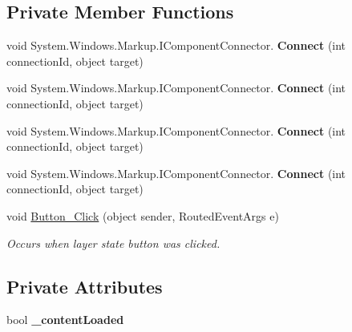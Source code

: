\subsection*{Private Member Functions}
\begin{DoxyCompactItemize}
\item 
\mbox{\label{class_wpf_handler_1_1_u_i_1_1_controls_1_1_header_a51aa62d103bb6008eb6760c6ff8a9a3d}} 
void System.\+Windows.\+Markup.\+I\+Component\+Connector. {\bfseries Connect} (int connection\+Id, object target)
\item 
\mbox{\label{class_wpf_handler_1_1_u_i_1_1_controls_1_1_header_a51aa62d103bb6008eb6760c6ff8a9a3d}} 
void System.\+Windows.\+Markup.\+I\+Component\+Connector. {\bfseries Connect} (int connection\+Id, object target)
\item 
\mbox{\label{class_wpf_handler_1_1_u_i_1_1_controls_1_1_header_a51aa62d103bb6008eb6760c6ff8a9a3d}} 
void System.\+Windows.\+Markup.\+I\+Component\+Connector. {\bfseries Connect} (int connection\+Id, object target)
\item 
\mbox{\label{class_wpf_handler_1_1_u_i_1_1_controls_1_1_header_a51aa62d103bb6008eb6760c6ff8a9a3d}} 
void System.\+Windows.\+Markup.\+I\+Component\+Connector. {\bfseries Connect} (int connection\+Id, object target)
\item 
void \mbox{\hyperlink{class_wpf_handler_1_1_u_i_1_1_controls_1_1_header_ae986415a1ad448e5d3a6c5b88504f11d}{Button\+\_\+\+Click}} (object sender, Routed\+Event\+Args e)
\begin{DoxyCompactList}\small\item\em Occurs when layer state button was clicked. \end{DoxyCompactList}\end{DoxyCompactItemize}
\subsection*{Private Attributes}
\begin{DoxyCompactItemize}
\item 
\mbox{\label{class_wpf_handler_1_1_u_i_1_1_controls_1_1_header_a90429ce83ea8bb00102a0e1bd2c660c1}} 
bool {\bfseries \+\_\+content\+Loaded}
\end{DoxyCompactItemize}


